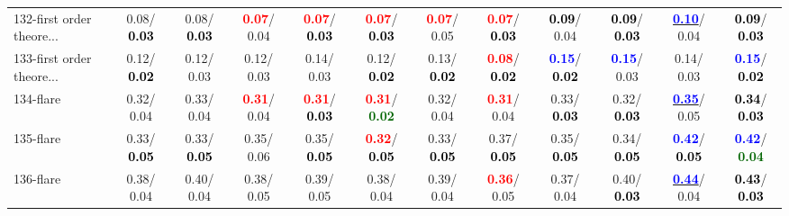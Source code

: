 \begin{table}[h]
\begin{center}
{\begin{tabular}{lc|c|c|c|c|c|c|c|c|c|c}
132-first order theore... &   0.08/\textcolor{black}{\textbf{  0.03}} &   0.08/\textcolor{black}{\textbf{  0.03}} & \textcolor{red}{\textbf{  0.07}}/  0.04 & \textcolor{red}{\textbf{  0.07}}/\textcolor{black}{\textbf{  0.03}} & \textcolor{red}{\textbf{  0.07}}/\textcolor{black}{\textbf{  0.03}} & \textcolor{red}{\textbf{  0.07}}/  0.05 & \textcolor{red}{\textbf{  0.07}}/\textcolor{black}{\textbf{  0.03}} & \textcolor{black}{\textbf{  0.09}}/  0.04 & \textcolor{black}{\textbf{  0.09}}/\textcolor{black}{\textbf{  0.03}} & \underline{\textcolor{blue}{\textbf{  0.10}}}/  0.04 & \textcolor{black}{\textbf{  0.09}}/\textcolor{black}{\textbf{  0.03}} \\
133-first order theore... &   0.12/\textcolor{black}{\textbf{  0.02}} &   0.12/  0.03 &   0.12/  0.03 &   0.14/  0.03 &   0.12/\textcolor{black}{\textbf{  0.02}} &   0.13/\textcolor{black}{\textbf{  0.02}} & \textcolor{red}{\textbf{  0.08}}/\textcolor{black}{\textbf{  0.02}} & \textcolor{blue}{\textbf{  0.15}}/\textcolor{black}{\textbf{  0.02}} & \textcolor{blue}{\textbf{  0.15}}/  0.03 &   0.14/  0.03 & \textcolor{blue}{\textbf{  0.15}}/\textcolor{black}{\textbf{  0.02}} \\
134-flare &   0.32/  0.04 &   0.33/  0.04 & \textcolor{red}{\textbf{  0.31}}/  0.04 & \textcolor{red}{\textbf{  0.31}}/\textcolor{black}{\textbf{  0.03}} & \textcolor{red}{\textbf{  0.31}}/\textcolor{darkgreen}{\textbf{  0.02}} &   0.32/  0.04 & \textcolor{red}{\textbf{  0.31}}/  0.04 &   0.33/\textcolor{black}{\textbf{  0.03}} &   0.32/\textcolor{black}{\textbf{  0.03}} & \underline{\textcolor{blue}{\textbf{  0.35}}}/  0.05 & \textcolor{black}{\textbf{  0.34}}/\textcolor{black}{\textbf{  0.03}} \\
135-flare &   0.33/\textcolor{black}{\textbf{  0.05}} &   0.33/\textcolor{black}{\textbf{  0.05}} &   0.35/  0.06 &   0.35/\textcolor{black}{\textbf{  0.05}} & \textcolor{red}{\textbf{  0.32}}/\textcolor{black}{\textbf{  0.05}} &   0.33/\textcolor{black}{\textbf{  0.05}} &   0.37/\textcolor{black}{\textbf{  0.05}} &   0.35/\textcolor{black}{\textbf{  0.05}} &   0.34/\textcolor{black}{\textbf{  0.05}} & \textcolor{blue}{\textbf{  0.42}}/\textcolor{black}{\textbf{  0.05}} & \textcolor{blue}{\textbf{  0.42}}/\textcolor{darkgreen}{\textbf{  0.04}} \\ \hline
136-flare &   0.38/  0.04 &   0.40/  0.04 &   0.38/  0.05 &   0.39/  0.05 &   0.38/  0.04 &   0.39/  0.04 & \textcolor{red}{\textbf{  0.36}}/  0.05 &   0.37/  0.04 &   0.40/\textcolor{black}{\textbf{  0.03}} & \underline{\textcolor{blue}{\textbf{  0.44}}}/  0.04 & \textcolor{black}{\textbf{  0.43}}/\textcolor{black}{\textbf{  0.03}} \\

\end{tabular}}
\end{center}
\end{table}
